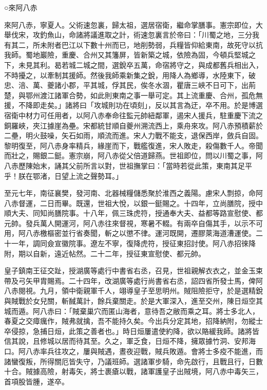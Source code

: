 
\begin{pinyinscope}

 ○來阿八赤



 來阿八赤，寧夏人。父術速忽裏，歸太祖，選居宿衛，繼命掌膳事。憲宗即位，大舉伐宋，攻釣魚山，命諸將議進取之計，術速忽裏言於帝曰：「川蜀之地，三分我有其二，所未附者巴江以下數十州而已，地削勢弱，兵糧皆仰給東南，故死守以抗我師。蜀地巖險，重慶、合州又其籓屏，皆新築之城，依險為固，今頓兵堅城之下，未見其利。曷若城二城之間，選銳卒五萬，命宿將守之，與成都舊兵相出入，不時擾之，以牽制其援師。然後我師乘新集之銳，用降人為鄉導，水陸東下，破忠、涪、萬、夔諸小郡，平其城，俘其民，俟冬水涸，瞿唐三峽不日可下，出荊楚，與鄂州渡江諸軍合勢，如此則東南之事一舉可定。其上流重慶、合州，孤危無援，不降即走矣。」諸將曰「攻城則功在頃刻」，反以其言為迂，卒不用。於是博選宿衛中材力可任用者，以阿八赤奉命往監元帥紐鄰軍，遏宋人援兵，駐重慶下流之銅羅峽，夾江據崖為壘。宋都統甘順自夔州溯流西上，乘舟來攻。阿八赤預積薪於二壘，明火鼓噪，矢石如雨，順流而進。宋人力戰不能支，退保西岸，斂兵自固。黎明復至，阿八赤身率精兵，緣崖而下，戰艦復進，宋人敗走，殺傷數千人。帝聞而壯之，賜銀二鋌。憲宗崩，阿八赤從父倍道歸燕。世祖即位，問以川蜀之事，阿八赤歷陳始末，誦其父前所言以對，世祖撫掌曰：「當時若從此策，東南其足平乎！朕在鄂渚，日望上流之聲勢耳。」



 至元七年，南征襄樊，發河南、北器械糧儲悉聚於淮西之義陽。慮宋人剽掠，命阿八赤督運，二日而畢。既還，世祖大悅，以銀一鋌賜之。十四年，立尚膳院，授中順大夫、同知尚膳院事。十八年，佩三珠虎符，授通奉大夫、益都等路宣慰使、都元帥。發兵萬人開運河，阿八赤往來督視，寒暑不輟。有兩卒自傷其手，以示不可用，阿八赤檄樞密並行省奏聞，斬之以懲不律。運河既開，遷膠萊海道漕運使。二十一年，調同僉宣徽院事。遼左不寧，復降虎符，授征東招討使。阿八赤招徠降附，期以自新，遠近帖然。二十二年，授征東宣慰使、都元帥。



 皇子鎮南王征交趾，授湖廣等處行中書省右丞，召見，世祖親解衣衣之，並金玉束帶及弓矢甲胄賜焉。二十四年，改湖廣等處行尚書省右丞，詔四省所發士馬，俾阿八赤閱視。九月，領中衛親軍千人，翊導皇子至思明州。賊阻險拒守，於是選精銳與賊戰於女兒關，斬馘萬計，餘兵棄關走。於是大軍深入，進至交州，陳日烜空其城而遁。阿八赤曰：「賊棄巢穴而匿山海者，意待吾之敝而乘之耳。將士多北人，春夏之交瘴癘作，賊弗就擒，吾不能持久矣。今出兵分定其地，招降納附，勿縱士卒侵掠，急捕日烜，此策之善者也。」時日烜屢遣使約降，欲以賂緩我師。諸將皆信其說，且修城以居而待其至。久之，軍乏食，日烜不降，擁眾據竹洞、安邦海口。阿八赤率兵往攻之，屢與賊遇，晝夜迎戰，賊兵敗遁。會將士多疫不能進，而諸蠻復叛，所得關厄皆失守，乃議班師。選諸軍步騎，命先啟行，且戰且行，日數十合。賊據高險，射毒矢，將士裹瘡以戰，諸軍護皇子出賊境，阿八赤中毒矢三，首項股皆腫，遂卒。




\end{pinyinscope}
